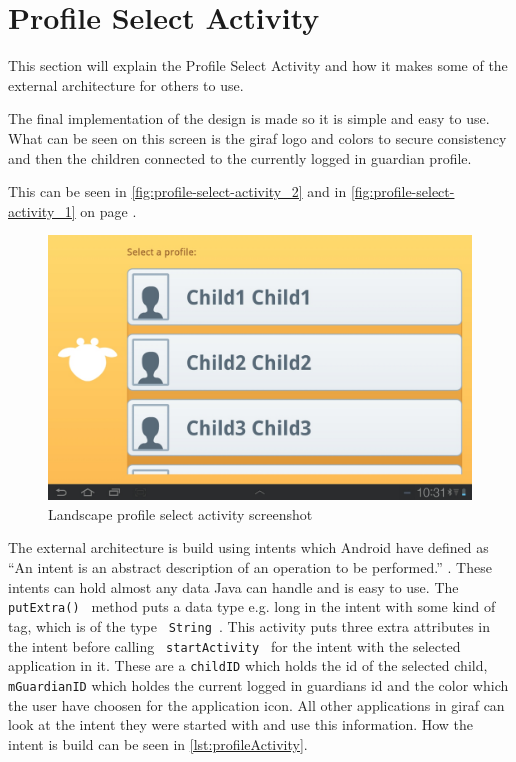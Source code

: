 \section{Profile Select Activity}
This section will explain the Profile Select Activity and how it makes some of the external architecture for others to use.

The final implementation of the design is made so it is simple and easy to use. What can be seen on this screen is the giraf logo and colors to secure consistency and then the children connected to the currently logged in guardian profile.

This can be seen in \autoref{fig:profile-select-activity_2} and in \autoref{fig:profile-select-activity_1} on page \pageref{fig:profile-select-activity_1}.

\begin{figure}[h!]
	\centering
	\includegraphics[scale=0.3]{gfx/profile-select-activity_2.jpg}
	\caption{Landscape profile select activity screenshot}
	\label{fig:profile-select-activity_2}
\end{figure}

The external architecture is build using intents which Android have defined as ``An intent is an abstract description of an operation to be performed.'' \citep{android:intent}. These intents can hold almost any data Java can handle and is easy to use. The \verb + putExtra() + method puts a data type e.g. long in the intent with some kind of tag, which is of the type \verb + String +. This activity puts three extra attributes in the intent before calling \verb + startActivity + for the intent with the selected application in it. These are a \verb +childID+ which holds the id of the selected child, \verb +mGuardianID+ which holdes the current logged in guardians id and the color which the user have choosen for the application icon. All other applications in giraf can look at the intent they were started with and use this information. How the intent is build can be seen in \autoref{lst:profileActivity}.

